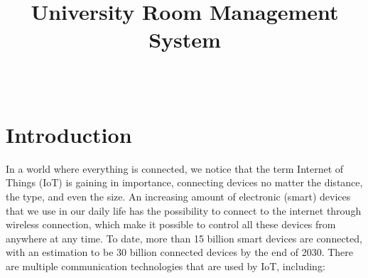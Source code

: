 \documentclass[conference,onecolumn]{IEEEtran}
\begin{document}
\title{University Room Management System\\} %

\author{\\ %

}

\maketitle


\newpage
\tableofcontents

\newpage
\section{Introduction}
In a world where everything is connected, we notice that the term Internet of Things (IoT) is gaining in importance, connecting devices no matter the distance, the type, and even the size. An increasing amount of electronic (smart) devices that we use in our daily life has the possibility to connect to the internet through wireless connection, which make it possible to control all these devices from anywhere at any time. To date, more than 15 billion smart devices are connected, with an estimation to be 30 billion connected devices by the end of 2030. There are multiple communication technologies that are used by IoT, including:
\end{document}
